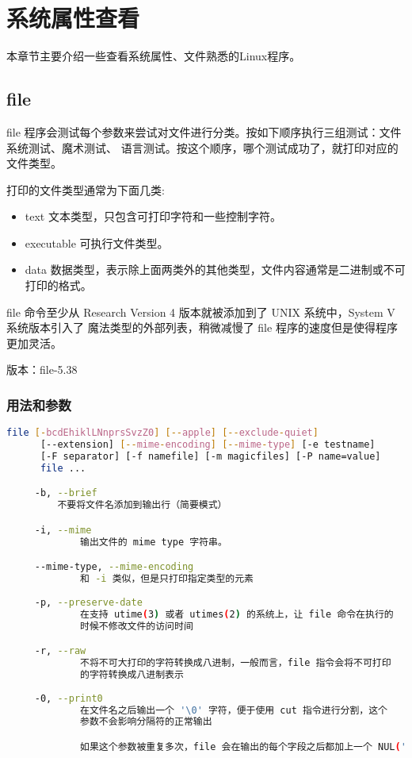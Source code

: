 \chapter{系统属性查看}

本章节主要介绍一些查看系统属性、文件熟悉的Linux程序。

\section{file}

file 程序会测试每个参数来尝试对文件进行分类。按如下顺序执行三组测试：文件系统测试、魔术测试、
语言测试。按这个顺序，哪个测试成功了，就打印对应的文件类型。

打印的文件类型通常为下面几类:
\begin{itemize}
    \item text 文本类型，只包含可打印字符和一些控制字符。
    \item executable 可执行文件类型。
    \item data 数据类型，表示除上面两类外的其他类型，文件内容通常是二进制或不可打印的格式。
\end{itemize}

file 命令至少从 Research Version 4 版本就被添加到了 UNIX 系统中，System V 系统版本引入了
魔法类型的外部列表，稍微减慢了 file 程序的速度但是使得程序更加灵活。

版本：file-5.38

\subsection{用法和参数}

\begin{lstlisting}[language=bash, numbersep=1em, numberstyle=\footnotesize , breaklines=true]
file [-bcdEhiklLNnprsSvzZ0] [--apple] [--exclude-quiet]
      [--extension] [--mime-encoding] [--mime-type] [-e testname]
      [-F separator] [-f namefile] [-m magicfiles] [-P name=value]
      file ...

     -b, --brief
	     不要将文件名添加到输出行（简要模式）

     -i, --mime
             输出文件的 mime type 字符串。

     --mime-type, --mime-encoding
             和 -i 类似，但是只打印指定类型的元素
             
     -p, --preserve-date
             在支持 utime(3) 或者 utimes(2) 的系统上，让 file 命令在执行的
             时候不修改文件的访问时间

     -r, --raw
             不将不可大打印的字符转换成八进制，一般而言，file 指令会将不可打印
             的字符转换成八进制表示
             
     -0, --print0
             在文件名之后输出一个 '\0' 字符，便于使用 cut 指令进行分割，这个
             参数不会影响分隔符的正常输出

             如果这个参数被重复多次，file 会在输出的每个字段之后都加上一个 NUL('\0')

\end{lstlisting}


